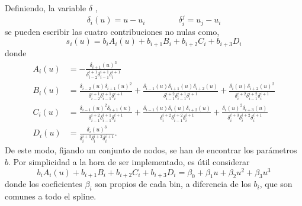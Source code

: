 Definiendo, la variable $\delta$ \cite{paperPhis},
\begin{equation}
  \delta_i(u) = u - u_i \qquad \qquad \delta_i^j = u_j -u_i
\end{equation}
se pueden escribir las cuatro contribuciones no nulas como,
\begin{equation}
  s_i(u) = b_i A_i(u) + b_{i+1} B_i + b_{i+2} C_i + b_{i+3} D_i 
\end{equation}
donde
\begin{equation}
\begin{split}
  A_i(u)&= -\frac{ \delta_{i+1}(u) ^3}
                 { \delta_{i-2}^{i+1} \delta_{i-1}^{i+1} \delta_{i  }^{i+1}}\\
  B_i(u)&=  \frac{ \delta_{i-2}(u) \delta_{i+1}(u)^2 }
                 { \delta_{i-2}^{i+1} \delta_{i-1}^{i+1} \delta_{i  }^{i+1}} 
           +\frac{ \delta_{i-1}(u) \delta_{i+1}(u) \delta_{i+2}(u) }
                 { \delta_{i-1}^{i+2} \delta_{i-1}^{i+1} \delta_{i  }^{i+1}} 
           +\frac{ \delta_{i}(u) \delta_{i+2}(u)^2 }
                 { \delta_{i  }^{i+2} \delta_{i-1}^{i+2} \delta_{i  }^{i+1}} \\
  C_i(u)&=  \frac{ \delta_{i-1}(u)^2 \delta_{i+1}(u) }
                 { \delta_{i-1}^{i+2} \delta_{i-1}^{i+1} \delta_{i  }^{i+1}} 
           +\frac{ \delta_{i-1}(u) \delta_{i}(u) \delta_{i+2}(u) }
                 { \delta_{i  }^{i+2} \delta_{i-1}^{i+2} \delta_{i  }^{i+1}} 
           +\frac{ \delta_{i}(u)^2 \delta_{i+3}(u) }
                 { \delta_{i  }^{i+3} \delta_{i  }^{i+2} \delta_{i  }^{i+1}} \\
  D_i(u)&=  \frac{ \delta_{i}(u) ^3}
                 { \delta_{i  }^{i+3} \delta_{i  }^{i+2} \delta_{i  }^{i+1}}.
\end{split}
\end{equation}
De este modo, fijando un conjunto de nodos, se han de encontrar los parámetros $b$. Por simplicidad a la hora de ser implementado, es útil considerar
\begin{equation}
   b_i A_i(u) + b_{i+1} B_i + b_{i+2} C_i + b_{i+3} D_i = \beta_0 + \beta_1 u + \beta_2 u^2 + \beta_3 u^3
\end{equation}
donde los coeficientes $\beta_i$ son propios de cada bin, a diferencia de los $b_i$, que son comunes a todo el spline. 



